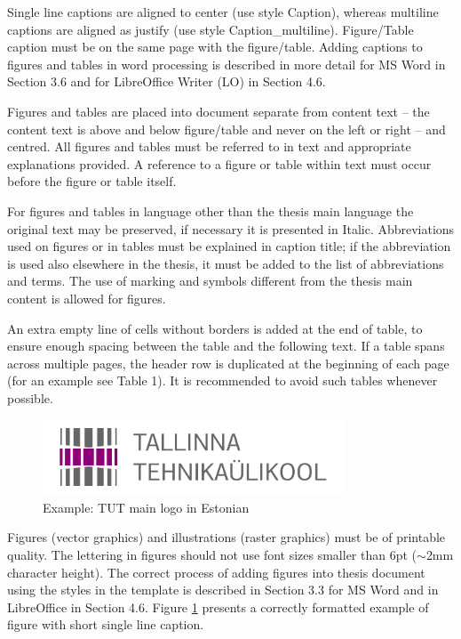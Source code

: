 Single line captions are aligned to center (use style Caption),
whereas multiline captions are aligned as justify (use style
Caption\_multiline). Figure/Table caption must be on the same page
with the figure/table. Adding captions to figures and tables in word
processing is described in more detail for MS Word in Section 3.6 and
for LibreOffice Writer (LO) in Section 4.6.

Figures and tables are placed into document separate from content text
-- the content text is above and below figure/table and never on the
left or right -- and centred. All figures and tables must be referred
to in text and appropriate explanations provided. A reference to a
figure or table within text must occur before the figure or table
itself.

For figures and tables in language other than the thesis main language
the original text may be preserved, if necessary it is presented in
Italic. Abbreviations used on figures or in tables must be explained
in caption title; if the abbreviation is used also elsewhere in the
thesis, it must be added to the list of abbreviations and terms. The
use of marking and symbols different from the thesis main content is
allowed for figures.


An extra empty line of cells without borders is added at the end of
table, to ensure enough spacing between the table and the following
text. If a table spans across multiple pages, the header row is
duplicated at the beginning of each page (for an example see Table
1). It is recommended to avoid such tables whenever possible.

\begin{figure}[!ht]
  \centering
  \includegraphics[width=0.8\textwidth]{figures/TTU_peamine_logo_EST_print}
  \caption{ Example: TUT main logo in Estonian}
  \label{fig:logo}
\end{figure}

Figures (vector graphics) and illustrations (raster graphics) must be
of printable quality. The lettering in figures should not use font
sizes smaller than 6pt ($\sim$2mm character height). The correct
process of adding figures into thesis document using the styles in the
template is described in Section 3.3 for MS Word and in LibreOffice in
Section 4.6.  Figure \ref{fig:logo} presents a correctly formatted
example of figure with short single line caption.

